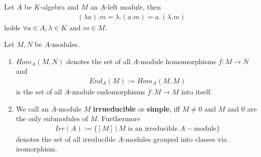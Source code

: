 \documentclass[]{article}
\begin{document}
\begin{theorem*}
    Let \(A\) be \(K\)-algebra and \(M\) an \(A\)-left module, then
    \begin{align*}
        (\lambda a). m = \lambda .(a.m) = a.(\lambda.m)
    \end{align*}
    holds \(\forall a \in A, \lambda \in K\) and \(m \in M\).
\end{theorem*}

\setcounter{theorem}{7}
\begin{definition}
    Let \(M,N\) be \(A\)-modules. 
    \begin{enumerate}
        \item \(Hom_A(M,N)\) denotes the set of all \(A\)-module homomorphisms \(f:M \rightarrow N\) and 
            \begin{align*}
                End_A(M):= Hom_A(M,M)
            \end{align*} 
            is the set of all \(A\)-module endomorphisms \(f:M \rightarrow M\) into itself.
        \item We call an \(A\)-module \(M\) \textbf{irrueducible} or \textbf{simple}, iff \(M \neq 0\) and
            \(M\) and \(0\) are the only submodules of \(M\). Furthermore
            \begin{align*}
                Irr(A) := \{[M] \ | \ M \text{ is an irreducible } A-\text{module}\}
            \end{align*}
            denotes the set of all irreducible \(A\)-modules grouped into classes via isomorphism. 
    \end{enumerate}
\end{definition}
\end{document}
